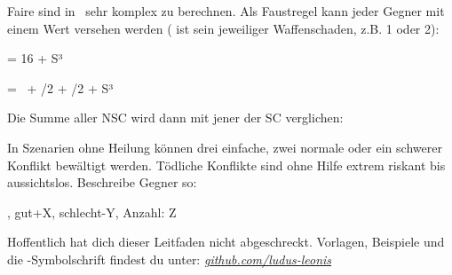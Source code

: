 {		Faire  sind in \nipajin\ sehr komplex zu berechnen. Als Faustregel kann jeder Gegner mit einem Wert versehen werden ( ist sein jeweiliger Waffenschaden, z.B. 1 oder 2):

		\vspace{3pt}
		\centerline{ = 16 + S³}
		\vspace{3pt}
		\centerline{ = \HD\ + \AD/2 + \RD/2 + S³}
		\vspace{3pt}

		\noindent
		Die Summe aller NSC wird dann mit jener der SC verglichen:


		\noindent
		In Szenarien ohne Heilung können drei einfache, zwei normale oder ein schwerer Konflikt bewältigt werden. Tödliche Konflikte sind ohne Hilfe extrem riskant bis aussichtslos. Beschreibe Gegner so:

		, gut+X, schlecht-Y, Anzahl: Z


		\noindent
		Hoffentlich hat dich dieser Leitfaden nicht abgeschreckt. Vorlagen, Beispiele und die \nipajin-Symbolschrift findest du unter:  \href{https://github.com/ludus-leonis}{\emph{github.com/ludus-leonis}}

}
